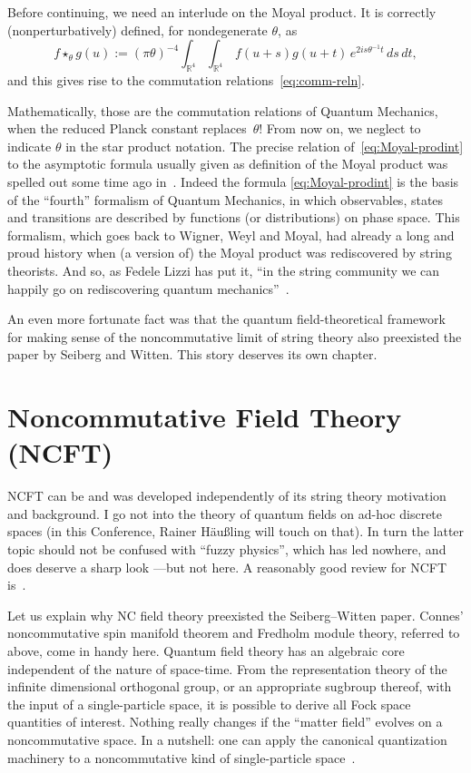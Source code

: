 \documentclass[a4paper,12pt]{article}
\newcommand{\R}{\mathbb{R}}         %
\newcommand{\1}{\mathbf{1}}         %
\newcommand{\7}{\dagger}            %
\newcommand{\8}{\bullet}            %
\renewcommand{\.}{\cdot}            %
\renewcommand{\:}{\colon}           %
\begin{document}
\medskip

Before continuing, we need an interlude on the Moyal product. It is
correctly (nonperturbatively) defined, for nondegenerate $\theta$, as
\begin{equation}
f \star_\theta g(u) := (\pi\theta)^{-4}
\int_{\R^4}\int_{\R^4}\,f(u + s)g(u + t)\,e^{2is\theta^{-1}t}\,ds\,dt,
\label{eq:Moyal-prodint}
\end{equation}
and this gives rise to the commutation relations~\eqref{eq:comm-reln}.

Mathematically, those are the commutation relations of Quantum
Mechanics, when the reduced Planck constant replaces~$\theta$! From
now on, we neglect to indicate $\theta$ in the star product notation.
The precise relation of~\eqref{eq:Moyal-prodint} to the asymptotic
formula usually given as definition of the Moyal product was spelled
out some time ago in~\cite{Nereid}. Indeed the formula
\eqref{eq:Moyal-prodint} is the basis of the ``fourth'' formalism of
Quantum Mechanics, in which observables, states and transitions are
described by functions (or distributions) on phase space. This
formalism, which goes back to Wigner, Weyl and Moyal, had already a
long and proud history when (a version of) the Moyal product was
rediscovered by string theorists. And so, as Fedele Lizzi has put it,
``in the string community we can happily go on rediscovering quantum
mechanics''~\cite{LizziViewpoint}.

An even more fortunate fact was that the quantum field-theoretical
framework for making sense of the noncommutative limit of string
theory also preexisted the paper by Seiberg and Witten. This story
deserves its own chapter.


\section{Noncommutative Field Theory (NCFT)}

NCFT can be and was developed independently of its string theory
motivation and background. I go not into the theory of quantum fields
on ad-hoc discrete spaces (in this Conference, Rainer H\"au{\ss}ling
will touch on that). In turn the latter topic should not be confused
with ``fuzzy physics'', which has led nowhere, and does deserve a
sharp look ---but not here. A reasonably good review for NCFT
is~\cite{DouglasN}.

Let us explain why NC field theory preexisted the Seiberg--Witten
paper. Connes' noncommutative spin manifold theorem and Fredholm
module theory, referred to above, come in handy here. Quantum field
theory has an algebraic core independent of the nature of space-time.
From the representation theory of the infinite dimensional orthogonal
group, or an appropriate sugbroup thereof, with the input of a
single-particle space, it is possible to derive all Fock space
quantities of interest. Nothing really changes if the ``matter field''
evolves on a noncommutative space. In a nutshell: one can apply the
canonical quantization machinery to a noncommutative kind of
single-particle space~\cite{Atlas}.
\end{document}
